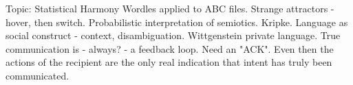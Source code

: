 Topic: Statistical Harmony
		Wordles applied to ABC files. Strange attractors - hover, then switch.
		Probabilistic interpretation of semiotics. Kripke. Language as social construct - context, disambiguation.
		Wittgenstein private language. True communication is - always? - a feedback loop. Need an "ACK". Even then the actions of the recipient
		are the only real indication that intent has truly been communicated.

